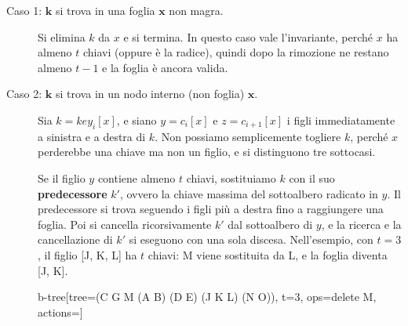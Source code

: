 \begin{description}
  \item[Caso 1: $\mathbf{k}$ si trova in una foglia $\mathbf{x}$ non magra.] Si elimina $k$ da $x$ e si termina. In questo caso vale l'invariante, perché $x$ ha almeno $t$ chiavi (oppure è la radice), quindi dopo la rimozione ne restano almeno $t-1$ e la foglia è ancora valida. 
  \item[Caso 2: $\mathbf{k}$ si trova in un nodo interno (non foglia) $\mathbf{x}$.] Sia $k = \mathit{key}_i[x]$, e siano $y = c_i[x]$ e $z = c_{i+1}[x]$ i figli immediatamente a sinistra e a destra di $k$. Non possiamo semplicemente togliere $k$, perché $x$ perderebbe una chiave ma non un figlio, e si distinguono tre sottocasi.
  
  \begin{casofig}[2a]
    Se il figlio $y$ contiene almeno $t$ chiavi, sostituiamo $k$ con il suo \textbf{predecessore} $k'$, ovvero la chiave massima del sottoalbero radicato in $y$. Il predecessore si trova seguendo i figli più a destra fino a raggiungere una foglia. Poi si cancella ricorsivamente $k'$ dal sottoalbero di $y$, e la ricerca e la cancellazione di $k'$ si eseguono con una sola discesa. Nell'esempio, con $t = 3$, il figlio [J, K, L] ha $t$ chiavi: M viene sostituita da L, e la foglia diventa [J, K].
    \tcblower
    \begin{widget}{b-tree}[tree={(C G M (A B) (D E) (J K L) (N O))}, t=3, ops={delete M}, actions={}]
\end{widget}
\end{casofig}
\end{description}
